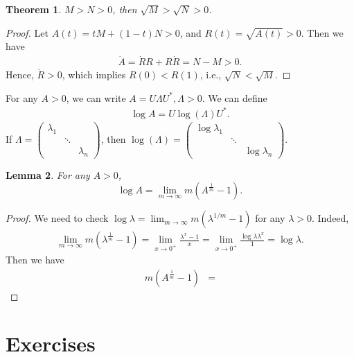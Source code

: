\documentclass[11pt]{book}
\newtheorem{theorem}{Theorem}[section]
\newtheorem{lemma}[theorem]{Lemma}
\theoremstyle{definition}
\numberwithin{equation}{subsection}
\begin{document}
\medskip

\begin{theorem}
$M > N > 0$, then $\sqrt{M} > \sqrt{N} > 0$.
\end{theorem}
\begin{proof}
Let $A(t) = tM + (1-t)N > 0$, and $R(t) = \sqrt{A(t)} > 0$. Then we have 
\begin{align*}
    \dot{A} = \dot{R}R + R \dot{R} = N - M > 0.
\end{align*}
Hence, $\dot{R} > 0$, which implies $R(0) < R(1)$, i.e., $\sqrt{N} < \sqrt{M}$.
\end{proof}

\medskip

For any $A > 0$, we can write $A = U \Lambda U^*, \Lambda > 0$. We can define 
\begin{align*}
    \log A = U \log (\Lambda) U^*.
\end{align*}
If $\Lambda = \begin{pmatrix}
\lambda_1 &  &  \\
& \ddots &  \\
&  & \lambda_n
\end{pmatrix}$, then $\log (\Lambda) = \begin{pmatrix}
 \log \lambda_1 &  &  \\
& \ddots &  \\
&  & \log \lambda_n
\end{pmatrix}$.

\medskip

\begin{lemma}
For any $A > 0$, $$\log A = \lim_{m\to\infty} m \left(A^{\frac{1}{m}} - 1\right).$$
\end{lemma}
\begin{proof}
We need to check $\log \lambda = \lim_{m\to\infty} m \left(\lambda^{1/m} - 1\right)$ for any $\lambda > 0$. Indeed, 
\begin{align*}
    \lim_{m\to\infty} m \left(\lambda^{\frac{1}{m}} - 1\right) = \lim_{x\to 0^+} \frac{\lambda^x - 1}{x} = \lim_{x\to 0^+} \frac{\log \lambda \lambda^x}{1} = \log \lambda. 
\end{align*}
Then we have
\begin{align*}
    m \left(A^{\frac{1}{m}} - 1\right) & = 
\end{align*}
\end{proof}

\chapter{Exercises}
\end{document}
